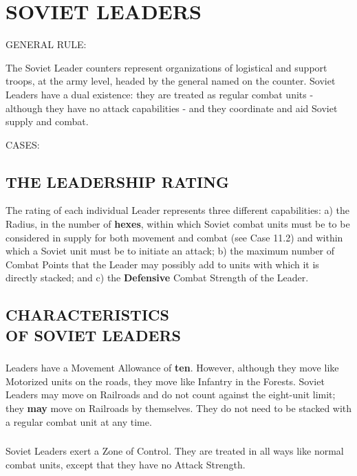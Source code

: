 \section{SOVIET LEADERS}

GENERAL RULE:

The Soviet Leader counters represent organizations of logistical and support troops, at the army level, headed by the general named on the counter. Soviet Leaders have a dual existence: they are treated as regular combat units - although they have no attack capabilities - and they coordinate and aid Soviet supply and combat.

CASES:

\subsection{THE LEADERSHIP RATING}

The rating of each individual Leader represents three different capabilities: a) the Radius, in the number of \textbf{hexes}, within which Soviet combat units must be to be considered in supply for both movement and combat (see Case 11.2) and within which a Soviet unit must be to initiate an attack; b) the maximum number of Combat Points that the Leader may possibly add to units with which it is directly stacked; and c) the \textbf{Defensive} Combat Strength of the Leader.

\subsection{CHARACTERISTICS\\OF SOVIET LEADERS}

\subsubsection{} Leaders have a Movement Allowance of \textbf{ten}. However, although they move like Motorized units on the roads, they move like Infantry in the Forests. Soviet Leaders may move on Railroads and do not count against the eight-unit limit; they \textbf{may} move on Railroads by themselves. They do not need to be stacked with a regular combat unit at any time.

\subsubsection{} Soviet Leaders exert a Zone of Control. They are treated in all ways like normal combat units, except that they have no Attack Strength.

